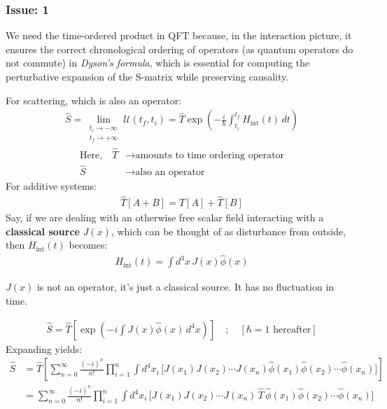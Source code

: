 \documentclass[14pt]{article} %
\begin{document}
{\begin{tcolorbox}
\subsubsection*{Issue: 1}
We need the time-ordered product in QFT because, in the interaction picture, it ensures the correct chronological ordering of operators (as quantum operators do not commute) in \textit{Dyson's formula}, which is essential for computing the perturbative expansion of the S-matrix while preserving causality.
\end{tcolorbox}
For scattering, which is also an operator:
\begin{align*}
\hat{S} = \lim_{\substack{t_i \to -\infty \\ t_f \to +\infty}} \mathcal{U}(t_f, t_i) = \hat{T} \exp\left( -\frac{i}{\hbar} \int_{t_i}^{t_f} H_{\text{int}}(t) \, dt \right)
\end{align*}
\begin{align*}
\text{Here,}\quad \hat{T} &\to \text{amounts to time ordering operator} \\
\hat{S} &\to \text{also an operator}
\end{align*}
For additive systems:
\begin{align*}
\hat{T}[A + B] = \hat{T}[A] + \hat{T}[B]
\end{align*}
Say, if we are dealing with an otherwise free scalar field interacting with a \textbf{classical source} $J(x)$, which can be thought of as disturbance from outside, then $H_{\text{int}}(t)$ becomes:
\begin{align*}
H_{\text{int}}(t) = \int d^3x \, J(x) \hat{\phi}(x)
\end{align*}
\begin{tcolorbox}
$J(x)$ is not an operator, it's just a classical source. It has no fluctuation in time.
\end{tcolorbox}
\begin{align*}
\hat{S} = \hat{T} \left[ \exp\left( -i \int J(x) \hat{\phi}(x) \, d^4x \right) \right] \quad ; \quad [\hbar =1 \,\,\text{hereafter}]
\end{align*}
Expanding yields:
\begin{align*}
\hat{S} &= \hat{T} \left[ \sum_{n=0}^{\infty} \frac{(-i)^n}{n!} \prod_{i=1}^{n} \int d^4x_i \, \big[ J(x_1) J(x_2) \cdots J(x_n) \hat{\phi}(x_1) \hat{\phi}(x_2) \cdots \hat{\phi}(x_n)\big] \right] \\
 &= \sum_{n=0}^{\infty} \frac{(-i)^n}{n!} \prod_{i=1}^{n} \int d^4x_i \, \big[ J(x_1) J(x_2) \cdots J(x_n) \,\hat{T}\, \hat{\phi}(x_1) \hat{\phi}(x_2) \cdots \hat{\phi}(x_n)\big]

\end{align*}}
\end{document}
